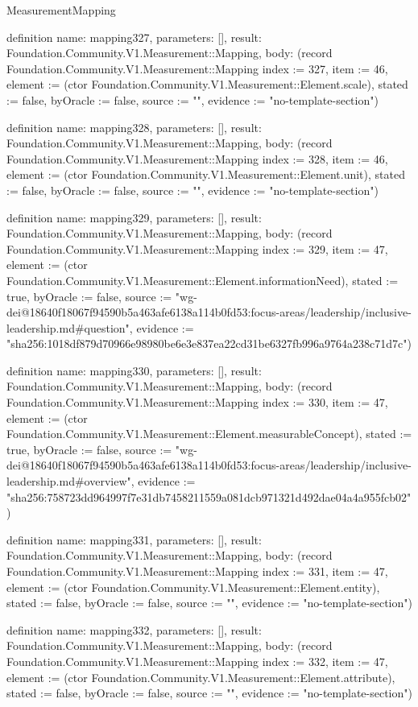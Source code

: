 \begin{lexlean}{MeasurementMapping}
\begin{semanticmodule}
definition{
  name: mapping327,
  parameters: [],
  result: Foundation.Community.V1.Measurement::Mapping,
  body: (record Foundation.Community.V1.Measurement::Mapping {index := 327, item := 46, element := (ctor Foundation.Community.V1.Measurement::Element.scale), stated := false, byOracle := false, source := "", evidence := "no-template-section"})
}

definition{
  name: mapping328,
  parameters: [],
  result: Foundation.Community.V1.Measurement::Mapping,
  body: (record Foundation.Community.V1.Measurement::Mapping {index := 328, item := 46, element := (ctor Foundation.Community.V1.Measurement::Element.unit), stated := false, byOracle := false, source := "", evidence := "no-template-section"})
}

definition{
  name: mapping329,
  parameters: [],
  result: Foundation.Community.V1.Measurement::Mapping,
  body: (record Foundation.Community.V1.Measurement::Mapping {index := 329, item := 47, element := (ctor Foundation.Community.V1.Measurement::Element.informationNeed), stated := true, byOracle := false, source := "wg-dei@18640f18067f94590b5a463afe6138a114b0fd53:focus-areas/leadership/inclusive-leadership.md#question", evidence := "sha256:1018df879d70966e98980be6e3e837ea22cd31be6327fb996a9764a238c71d7c"})
}

definition{
  name: mapping330,
  parameters: [],
  result: Foundation.Community.V1.Measurement::Mapping,
  body: (record Foundation.Community.V1.Measurement::Mapping {index := 330, item := 47, element := (ctor Foundation.Community.V1.Measurement::Element.measurableConcept), stated := true, byOracle := false, source := "wg-dei@18640f18067f94590b5a463afe6138a114b0fd53:focus-areas/leadership/inclusive-leadership.md#overview", evidence := "sha256:758723dd964997f7e31db7458211559a081dcb971321d492dae04a4a955fcb02"})
}

definition{
  name: mapping331,
  parameters: [],
  result: Foundation.Community.V1.Measurement::Mapping,
  body: (record Foundation.Community.V1.Measurement::Mapping {index := 331, item := 47, element := (ctor Foundation.Community.V1.Measurement::Element.entity), stated := false, byOracle := false, source := "", evidence := "no-template-section"})
}

definition{
  name: mapping332,
  parameters: [],
  result: Foundation.Community.V1.Measurement::Mapping,
  body: (record Foundation.Community.V1.Measurement::Mapping {index := 332, item := 47, element := (ctor Foundation.Community.V1.Measurement::Element.attribute), stated := false, byOracle := false, source := "", evidence := "no-template-section"})
}


\end{semanticmodule}
\end{lexlean}
